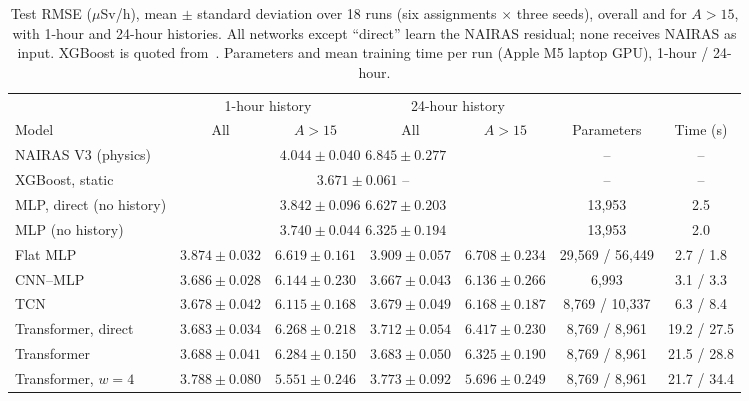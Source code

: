 \documentclass[10pt,twocolumn,letterpaper]{article}
\begin{document}
\begin{table}[t]
\caption{Test RMSE ($\mu$Sv/h), mean $\pm$ standard deviation over 18 runs (six assignments
$\times$ three seeds), overall and for $A>15$, with 1-hour and 24-hour histories. All networks
except ``direct'' learn the NAIRAS residual; none receives NAIRAS as input. XGBoost is quoted
from~\cite{kc2025}. Parameters and mean training time per run (Apple M5 laptop GPU), 1-hour / 24-hour.}
\label{tab:results}\vspace{3pt}
\centering\small
\setlength{\tabcolsep}{4.5pt}
\begin{tabular}{lcccccc}\toprule
 & \multicolumn{2}{c}{1-hour history} & \multicolumn{2}{c}{24-hour history} & & \\ \cmidrule(lr){2-3}\cmidrule(lr){4-5}
Model & All & $A>15$ & All & $A>15$ & Parameters & Time (s) \\ \midrule
NAIRAS V3 (physics) & \multicolumn{4}{c}{$4.044\pm0.040$ \quad $6.845\pm0.277$} & -- & -- \\
XGBoost, static~\cite{kc2025} & \multicolumn{4}{c}{$3.671\pm0.061$ \quad --} & -- & -- \\
MLP, direct (no history) & \multicolumn{4}{c}{$3.842\pm0.096$ \quad $6.627\pm0.203$} & 13,953 & 2.5 \\
MLP (no history) & \multicolumn{4}{c}{$3.740\pm0.044$ \quad $6.325\pm0.194$} & 13,953 & 2.0 \\ \midrule
Flat MLP & $3.874\pm0.032$ & $6.619\pm0.161$ & $3.909\pm0.057$ & $6.708\pm0.234$ & 29,569 / 56,449 & 2.7 / 1.8 \\
CNN--MLP & $3.686\pm0.028$ & $6.144\pm0.230$ & $\mathbf{3.667}\pm0.043$ & $6.136\pm0.266$ & 6,993 & 3.1 / 3.3 \\
TCN & $3.678\pm0.042$ & $6.115\pm0.168$ & $3.679\pm0.049$ & $6.168\pm0.187$ & 8,769 / 10,337 & 6.3 / 8.4 \\
Transformer, direct & $3.683\pm0.034$ & $6.268\pm0.218$ & $3.712\pm0.054$ & $6.417\pm0.230$ & 8,769 / 8,961 & 19.2 / 27.5 \\
Transformer & $3.688\pm0.041$ & $6.284\pm0.150$ & $3.683\pm0.050$ & $6.325\pm0.190$ & 8,769 / 8,961 & 21.5 / 28.8 \\
Transformer, $w=4$ & $3.788\pm0.080$ & $\mathbf{5.551}\pm0.246$ & $3.773\pm0.092$ & $5.696\pm0.249$ & 8,769 / 8,961 & 21.7 / 34.4 \\
\bottomrule
\end{tabular}
\end{table}
\end{document}
